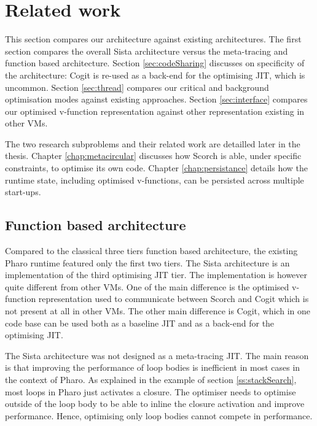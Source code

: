 \documentclass[a4paper,12pt,twoside]{../includes/ThesisStyle}
\begin{document}

\section{Related work}
\label{sec:relatedWorkArch}

This section compares our architecture against existing architectures. The first section compares the overall Sista architecture versus the meta-tracing and function based architecture. Section \ref{sec:codeSharing} discusses on specificity of the architecture: Cogit is re-used as a back-end for the optimising JIT, which is uncommon. Section \ref{sec:thread} compares our critical and background optimisation modes against existing approaches. Section \ref{sec:interface} compares our optimised v-function representation against other representation existing in other VMs.

The two research subproblems and their related work are detailled later in the thesis. Chapter \ref{chap:metacircular} discusses how Scorch is able, under specific constraints, to optimise its own code. Chapter \ref{chap:persistance} details how the runtime state, including optimised v-functions, can be persisted across multiple start-ups.

\subsection{Function based architecture}

Compared to the classical three tiers function based architecture, the existing Pharo runtime featured only the first two tiers. The Sista architecture is an implementation of the third optimising JIT tier. The implementation is however quite different from other VMs. One of the main difference is the optimised v-function representation used to communicate between Scorch and Cogit which is not present at all in other VMs. The other main difference is Cogit, which in one code base can be used both as a baseline JIT and as a back-end for the optimising JIT.

The Sista architecture was not designed as a meta-tracing JIT. The main reason is that improving the performance of loop bodies is inefficient in most cases in the context of Pharo. As explained in the example of section \ref{ss:stackSearch}, most loops in Pharo just activates a closure. The optimiser needs to optimise outside of the loop body to be able to inline the closure activation and improve performance. Hence, optimising only loop bodies cannot compete in performance.
\end{document}
